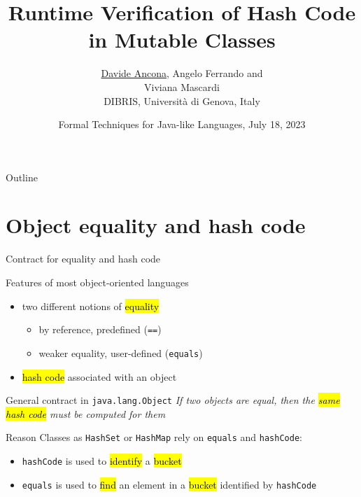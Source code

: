 \documentclass[10pt,usenames,dvipsnames]{beamer}
\title[Runtime Verification of Hash Code in Mutable Classes]{Runtime Verification of Hash Code in Mutable Classes}
\author[D. Ancona]{\underline{Davide Ancona}, Angelo Ferrando and \\ Viviana Mascardi \\[1ex]
  \small DIBRIS, Universit\`a di Genova, Italy}
\institute[]{DIBRIS, Universit\`a di Genova, Italy}
\date[FTfJP23]{Formal Techniques for Java-like Languages, July 18, 2023}
\begin{document}

\begin{frame}{Outline}
\tableofcontents%
\end{frame}

\section{Object equality and hash code}

\begin{frame}{Contract for equality and hash code}
  \begin{block}{Features of most object-oriented languages}
    \begin{itemize}
    \item two different notions of \hl{equality}
      \begin{itemize}
      \item by reference, predefined (\lstinline{==})
      \item weaker equality, user-defined (\lstinline{equals})
      \end{itemize}
      \item \hl{hash code} associated with an object
    \end{itemize}
  \end{block}

  \begin{block}{General contract in \lstinline[basicstyle=\ttfamily\large]{java.lang.Object}}
    \emph{If two objects are equal, then the \hl{same hash code} must be computed for them}
  \end{block}

    \begin{block}{Reason}
      Classes as \lstinline[basicstyle=\ttfamily\normalsize]{HashSet} or \lstinline[basicstyle=\ttfamily\normalsize]{HashMap} rely on \lstinline[basicstyle=\ttfamily\normalsize]{equals} and \lstinline[basicstyle=\ttfamily\normalsize]{hashCode}:
      \begin{itemize}
      \item \lstinline[basicstyle=\ttfamily\normalsize]{hashCode} is used to \hl{identify} a \hl{bucket}
      \item \lstinline[basicstyle=\ttfamily\normalsize]{equals} is used to \hl{find} an element in a \hl{bucket} identified by \lstinline[basicstyle=\ttfamily\normalsize]{hashCode}        
        \end{itemize}
  \end{block}

\end{frame}
\end{document}
